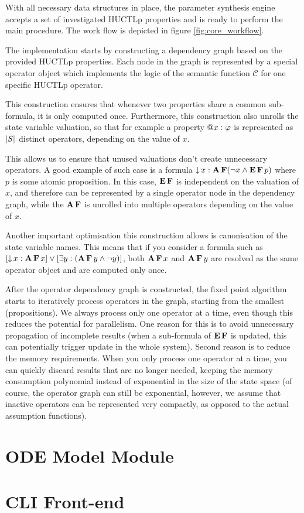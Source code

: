With all necessary data structures in place, the parameter synthesis engine accepts a set of investigated \ac{HUCTLp} properties and is ready to perform the main procedure. The work flow is depicted in figure \ref{fig:core_workflow}.

The implementation starts by constructing a dependency graph based on the provided \ac{HUCTLp} properties. Each node in the graph is represented by a special operator object which implements the logic of the semantic function $\mathcal{C}$ for one specific \ac{HUCTLp} operator. 

This construction ensures that whenever two properties share a common sub-formula, it is only computed once. Furthermore, this construction also unrolls the state variable valuation, so that for example a property $\operatorname{@\!} x : \varphi$ is represented as $|\mathit{S}|$ distinct operators, depending on the value of $x$. 


This allows us to ensure that unused valuations don't create unnecessary operators. A good example of such case is a formula $\operatorname{\downarrow} x : \operatorname{\mathbf{A}}\operatorname{\mathbf{F}} (\neg x \land \operatorname{\mathbf{E}}\operatorname{\mathbf{F}} p)$ where $p$ is some atomic proposition. In this case, $\operatorname{\mathbf{E}}\operatorname{\mathbf{F}}$ is independent on the valuation of $x$, and therefore can be represented by a single operator node in the dependency graph, while the $\operatorname{\mathbf{A}}\operatorname{\mathbf{F}}$ is unrolled into multiple operators depending on the value of $x$.

Another important optimisation this construction allows is canonisation of the state variable names. This means that if you consider a formula such as $[\operatorname{\downarrow} x : \operatorname{\mathbf{A}}\operatorname{\mathbf{F}} x] \lor [\exists y : (\operatorname{\mathbf{A}} \operatorname{\mathbf{F}} y \land \neg y)]$, both $\operatorname{\mathbf{A}}\operatorname{\mathbf{F}} x$ and $\operatorname{\mathbf{A}}\operatorname{\mathbf{F}} y$ are resolved as the same operator object and are computed only once. 

After the operator dependency graph is constructed, the fixed point algorithm starts to iteratively process operators in the graph, starting from the smallest (propositions). We always process only one operator at a time, even though this reduces the potential for parallelism. One reason for this is to avoid unnecessary propagation of incomplete results (when a sub-formula of $\operatorname{\mathbf{E}}\operatorname{\mathbf{F}}$ is updated, this can potentially trigger update in the whole system). Second reason is to reduce the memory requirements. When you only process one operator at a time, you can quickly discard results that are no longer needed, keeping the memory consumption polynomial instead of exponential in the size of the state space (of course, the operator graph can still be exponential, however, we assume that inactive operators can be represented very compactly, as opposed to the actual assumption functions).  

\section{ODE Model Module}



\section{CLI Front-end}
